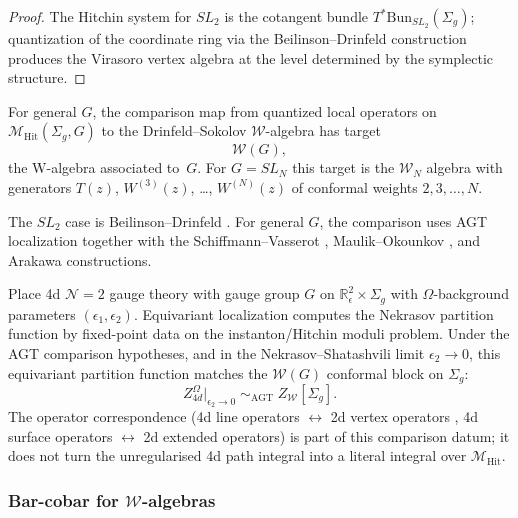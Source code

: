 \begin{proof}
The Hitchin system for $SL_2$ is the cotangent bundle $T^*\mathrm{Bun}_{SL_2}(\Sigma_g)$; quantization of the coordinate ring via the Beilinson--Drinfeld construction \cite{BD04} produces the Virasoro vertex algebra at the level determined by the symplectic structure.
\end{proof}

\begin{remark}
\label{rem:w-algebra-hitchin}
For general $G$, the comparison map from quantized local operators on
$\mathcal{M}_{\mathrm{Hit}}(\Sigma_g, G)$ to the Drinfeld--Sokolov
$\mathcal{W}$-algebra has target
\[
\mathcal{W}(G),
\]
the W-algebra associated to~$G$. For $G = SL_N$ this target is the
$\mathcal{W}_N$ algebra with generators
$T(z)$, $W^{(3)}(z)$, \ldots, $W^{(N)}(z)$
of conformal weights $2, 3, \ldots, N$.
\end{remark}

\begin{remark}
The $SL_2$ case is Beilinson--Drinfeld \cite{BD04}. For general
$G$, the comparison uses AGT localization together with the
Schiffmann--Vasserot \cite{SV13}, Maulik--Okounkov \cite{MO19}, and
Arakawa \cite{Ara07} constructions.
\end{remark}

\begin{remark}
Place 4d $\mathcal{N}=2$ gauge theory with gauge group $G$ on
$\mathbb{R}^2_\epsilon \times \Sigma_g$ with $\Omega$-background
parameters $(\epsilon_1, \epsilon_2)$.  Equivariant localization
computes the Nekrasov partition function by fixed-point data on the
instanton/Hitchin moduli problem.  Under the AGT comparison hypotheses,
and in the Nekrasov--Shatashvili limit $\epsilon_2 \to 0$, this
equivariant partition function matches the $\mathcal{W}(G)$ conformal
block on $\Sigma_g$:
\[Z_{4d}^{\Omega}\big|_{\epsilon_2 \to 0}
   \;\sim_{\mathrm{AGT}}\; Z_{\mathcal{W}}[\Sigma_g].\]
The operator correspondence (4d line operators $\leftrightarrow$ 2d
vertex operators \cite{DNP25}, 4d surface operators $\leftrightarrow$
2d extended operators) is part of this comparison datum; it does not
turn the unregularised 4d path integral into a literal integral over
\(\mathcal{M}_{\mathrm{Hit}}\).
\end{remark}

\subsubsection{Bar-cobar for $\mathcal{W}$-algebras}

